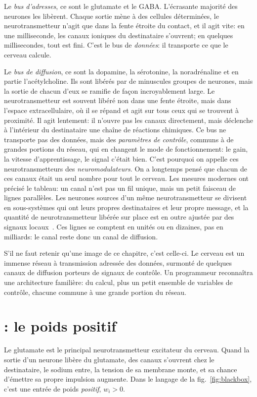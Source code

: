 Le \emph{bus d'adresses}, ce sont le glutamate et le GABA. L'écrasante majorité des neurones les libèrent. Chaque sortie mène à des cellules déterminées, le neurotransmetteur n'agit que dans la fente étroite du contact, et il agit vite: en une milliseconde, les canaux ioniques du destinataire s'ouvrent; en quelques millisecondes, tout est fini. C'est le bus de \emph{données}: il transporte ce que le cerveau calcule.

Le \emph{bus de diffusion}, ce sont la dopamine, la sérotonine, la noradrénaline et en partie l'acétylcholine. Ils sont libérés par de minuscules groupes de neurones, mais la sortie de chacun d'eux se ramifie de façon incroyablement large. Le neurotransmetteur est souvent libéré non dans une fente étroite, mais dans l'espace extracellulaire, où il se répand et agit sur tous ceux qui se trouvent à proximité. Il agit lentement: il n'ouvre pas les canaux directement, mais déclenche à l'intérieur du destinataire une chaîne de réactions chimiques. Ce bus ne transporte pas des données, mais des \emph{paramètres de contrôle}, communs à de grandes portions du réseau, qui en changent le mode de fonctionnement: le gain, la vitesse d'apprentissage, le signal \og c'était bien\fg. C'est pourquoi on appelle ces neurotransmetteurs des \emph{neuromodulateurs}. On a longtemps pensé que chacun de ces canaux était un seul nombre pour tout le cerveau. Les mesures modernes ont précisé le tableau: un canal n'est pas un fil unique, mais un petit faisceau de lignes parallèles. Les neurones sources d'un même neurotransmetteur se divisent en sous-systèmes qui ont leurs propres destinataires et leur propre message, et la quantité de neurotransmetteur libérée sur place est en outre ajustée par des signaux locaux~\cite{Ren2018,Poe2020}. Ces lignes se comptent en unités ou en dizaines, pas en milliards: le canal reste donc un canal de diffusion.

S'il ne faut retenir qu'une image de ce chapitre, c'est celle-ci. Le cerveau est un immense réseau à transmission adressée des données, surmonté de quelques canaux de diffusion porteurs de signaux de contrôle. Un programmeur reconnaîtra une architecture familière: du calcul, plus un petit ensemble de variables de contrôle, chacune commune à une grande portion du réseau.

\section{: le poids positif}

Le glutamate est le principal neurotransmetteur excitateur du cerveau. Quand la sortie d'un neurone libère du glutamate, des canaux s'ouvrent chez le destinataire, le sodium entre, la tension de sa membrane monte, et sa chance d'émettre sa propre impulsion augmente. Dans le langage de la fig.~\ref{fig:blackbox}, c'est une entrée de poids \emph{positif}, $w_i>0$.

